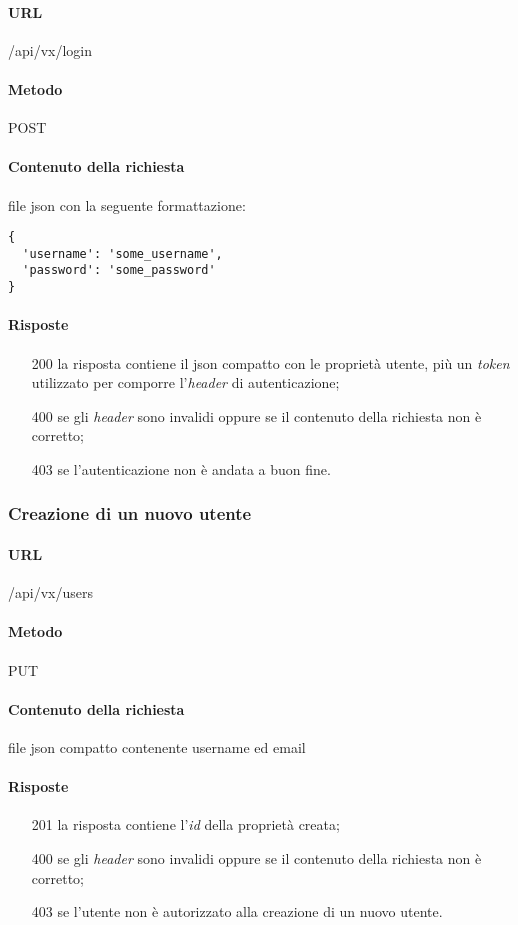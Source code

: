 \paragraph{URL}
/api/vx/login
\paragraph{Metodo}
POST
\paragraph{Contenuto della richiesta}
file \gls{json} con la seguente formattazione:
\begin{verbatim}
{
  'username': 'some_username',
  'password': 'some_password'
}
\end{verbatim}
\paragraph{Risposte}
\begin{itemize}
	\item[200] la risposta contiene il \gls{json} compatto con le proprietà utente, più un \emph{token} utilizzato per comporre l'\emph{header} di autenticazione;
	\item[400] se gli \emph{header} sono invalidi oppure se il contenuto della richiesta non è corretto;
	\item[403] se l'autenticazione non è andata a buon fine.
\end{itemize}

\subsubsection{Creazione di un nuovo utente}
\paragraph{URL}
/api/vx/users
\paragraph{Metodo}
PUT
\paragraph{Contenuto della richiesta}
file \gls{json} compatto contenente username ed email
\paragraph{Risposte}
\begin{itemize}
	\item[201] la risposta contiene l'\emph{id} della proprietà creata;
	\item[400] se gli \emph{header} sono invalidi oppure se il contenuto della richiesta non è corretto;
	\item[403] se l'utente non è autorizzato alla creazione di un nuovo utente.
\end{itemize}


